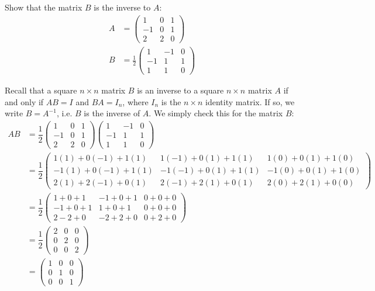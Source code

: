 \documentclass[11pt,letterpaper]{article}
\begin{document}
\newpage



 Show that the matrix $B$ is the inverse to $A$:
	\[
	\begin{aligned}
	A&= \begin{pmatrix} 1 & 0 & 1 \\ -1 & 0 & 1 \\ 2 & 2 & 0 \end{pmatrix} \\[0.3cm]
	B&= \frac{1}{2} \begin{pmatrix} 1 & -1 & 0 \\ -1 & 1 & 1 \\ 1 & 1 & 0 \end{pmatrix}
	\end{aligned}
	\] 

\sol Recall that a square $n \times n$ matrix $B$ is an inverse to a square $n \times n$ matrix $A$ if and only if $AB= I$ and $BA= I_n$, where $I_n$ is the $n \times n$ identity matrix. If so, we write $B= A^{-1}$, i.e. $B$ is the inverse of $A$. We simply check this for the matrix $B$:
	\[
	\begin{aligned}
	AB&= \dfrac{1}{2} \begin{pmatrix} 1 & 0 & 1 \\ -1 & 0 & 1 \\ 2 & 2 & 0 \end{pmatrix} \begin{pmatrix} 1 & -1 & 0 \\ -1 & 1 & 1 \\ 1 & 1 & 0 \end{pmatrix} \\
	&= \dfrac{1}{2} \begin{pmatrix} 1(1) + 0(-1) + 1(1) & 1(-1) + 0(1) + 1(1) & 1(0) + 0(1) + 1(0) \\
	-1(1) + 0(-1) + 1(1) & -1(-1) + 0(1) + 1(1) & -1(0) + 0(1) + 1(0) \\
	2(1) + 2(-1) + 0(1) & 2(-1) + 2(1) + 0 (1) & 2(0) + 2(1) + 0(0) 
	\end{pmatrix} \\
	&= \dfrac{1}{2} \begin{pmatrix} 1 + 0 + 1 & -1 + 0 + 1 & 0 + 0 + 0 \\
	-1 + 0 + 1 & 1 + 0 + 1 & 0 + 0 + 0 \\
	2 - 2 + 0 & -2 + 2 + 0 & 0 + 2 + 0 
	\end{pmatrix} \\
	&= \dfrac{1}{2} \begin{pmatrix} 2 & 0 & 0 \\ 0 & 2 & 0 \\ 0 & 0 & 2 \end{pmatrix} \\
	&= \begin{pmatrix} 1 & 0 & 0 \\ 0 & 1 & 0 \\ 0 & 0 & 1 \end{pmatrix}
	\end{aligned}
	\]
\end{document}
